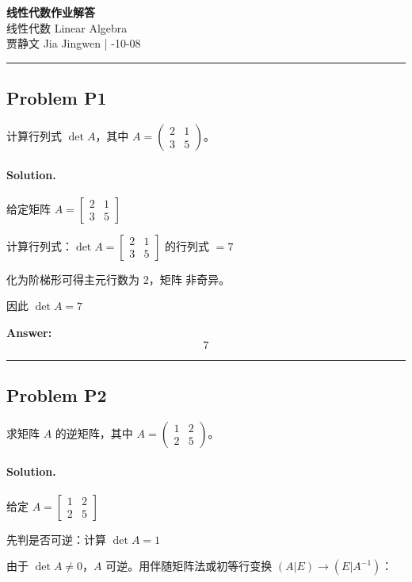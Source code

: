 \documentclass[12pt, a4paper]{article}
\newcommand{\problem}[1]{\subsection*{Problem #1}}
\newcommand{\solution}{\paragraph{Solution.}}
\begin{document}
\begin{center}
    {\LARGE\bfseries 线性代数作业解答} \\[0.5em]
    {\large 线性代数 Linear Algebra} \\[0.3em]
    贾静文 Jia Jingwen \quad | -10-08
\end{center}

\hrule
\vspace{1em}
\problem{P1}

计算行列式 $\det A$，其中 $A = \begin{pmatrix} 2 & 1 \\ 3 & 5 \end{pmatrix}$。

\solution


给定矩阵 $A = \left[\begin{matrix}2 & 1\\3 & 5\end{matrix}\right]$

计算行列式：$\det A = \left[\begin{matrix}2 & 1\\3 & 5\end{matrix}\right]$ 的行列式 $= 7$

化为阶梯形可得主元行数为 $2$，矩阵 $非奇异$。

因此 $\det A = 7$

\textbf{Answer:}
\[7\]


\vspace{1em}
\hrule
\vspace{1em}

\problem{P2}

求矩阵 $A$ 的逆矩阵，其中 $A = \begin{pmatrix} 1 & 2 \\ 2 & 5 \end{pmatrix}$。

\solution


给定 $A = \left[\begin{matrix}1 & 2\\2 & 5\end{matrix}\right]$

先判是否可逆：计算 $\det A = 1$

由于 $\det A \neq 0$，$A$ 可逆。用伴随矩阵法或初等行变换 $(A|E)\to(E|A^{-1})$：
\end{document}
